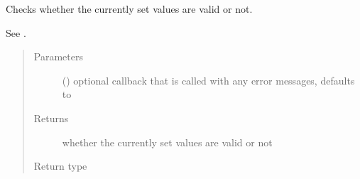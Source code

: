 \documentclass[letterpaper,10pt,english]{sphinxmanual}
\begin{document}
\begin{fulllineitems}
\begin{fulllineitems}
\begin{quote}
\begin{description}
\end{description}\end{quote}

\end{fulllineitems}


\begin{fulllineitems}
\label{\detokenize{autoapi/pine/client/models/index:pine.client.models.CollectionBuilder.is_valid}}
Checks whether the currently set values are valid or not.

See {\hyperref[\detokenize{autoapi/pine/client/models/index:pine.client.models.is_valid_collection}]{}}.
\begin{quote}\begin{description}
\item[{Parameters}] \leavevmode
{} (\sphinxstyleliteralemphasis{\sphinxupquote{, }}) \textendash{} optional callback that is called with any error messages, defaults to 

\item[{Returns}] \leavevmode
whether the currently set values are valid or not

\item[{Return type}] \leavevmode
{}

\end{description}\end{quote}

\end{fulllineitems}


\end{fulllineitems}

\end{document}
